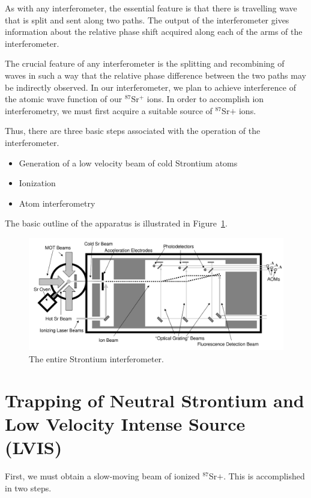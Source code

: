 As with any interferometer, the essential feature is that there is travelling wave that is split and sent along two paths. The output of the interferometer gives information about the relative phase shift acquired along each of the arms of the interferometer. 

The crucial feature of any interferometer is the splitting and recombining of waves in such a way that the relative phase difference between the two paths may be indirectly observed. In our interferometer, we plan to achieve interference of the atomic wave function of our $^{87}$Sr$^+$ ions. 
In order to accomplish ion interferometry, we must first acquire a suitable source of $^{87}$Sr$+$ ions. 

Thus, there are three basic steps associated with the operation of the interferometer. 
\begin{itemize}
\item Generation of a low velocity beam of cold Strontium atoms   
\item Ionization 
\item Atom interferometry
\end{itemize} 

The basic outline of the apparatus is illustrated in Figure~\ref{fig:IonInterferometer}.

\begin{figure}
\centerline{
\includegraphics[totalheight=0.3\textheight]{interferometer_diagram}
}
\caption[Ion Interferometer]{\label{fig:IonInterferometer}
The entire Strontium interferometer. } 
\end{figure}

\section{Trapping of Neutral Strontium and Low Velocity Intense Source (LVIS)}

First, we must obtain a slow-moving beam of ionized $^{87}$Sr$+$. This is accomplished in two steps. 

